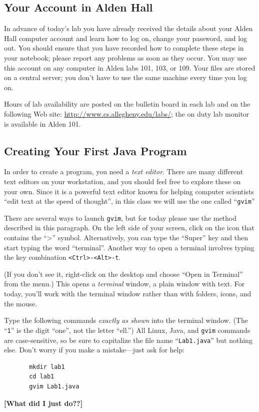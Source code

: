 \vspace*{-.3in}
\subsection*{Your Account in Alden Hall}

In advance of today's lab you have already received the details about your Alden Hall computer account and learn how to
log on, change your password, and log out.  You should ensure that you have recorded how to complete these steps in your
notebook; please report any problems as soon as they occur. You may use this account on any computer in Alden labs 101,
103, or 109. Your files are stored on a central server; you don't have to use the same machine every time you log on.

Hours of lab availability are posted on the bulletin board in each lab and on the following Web site:
\url{http://www.cs.allegheny.edu/labs/}; the on duty lab monitor is available in Alden 101.

\vspace*{-.1in}
\subsection*{Creating Your First Java Program}

In order to create a program, you need a {\em text editor}. There are many different text editors on your workstation, and
you should feel free to explore these on your own. Since it is a powerful text editor known for helping computer
scientists ``edit text at the speed of thought'', in this class we will use the one called ``{\tt gvim}''


There are several ways to launch {\tt gvim}, but for today please use the method described in this paragraph.  On the
left side of your screen, click on the icon that contains the ``>'' symbol.  Alternatively, you can type the ``Super''
key and then start typing the word ``terminal''.  Another way to open a terminal involves typing the key combination
{\tt <Ctrl>-<Alt>-t}.

(If you don't see it, right-click on the desktop and choose ``Open in Terminal'' from the menu.)  This opens a {\em
  terminal} window, a plain window with text. For today, you'll work with the terminal window rather than with folders,
icons, and the mouse.

Type the following commands {\em exactly as shown} into the terminal window. 
(The ``{\tt 1}'' is the digit ``one'', not the letter ``ell.'') All Linux, Java, 
and {\tt gvim}
commands are case-sensitive, so be sure to capitalize the file name 
``{\tt Lab1.java}'' but nothing else.
Don't worry if you make a mistake---just ask for help:
\begin{verbatim}
       mkdir lab1
       cd lab1
       gvim Lab1.java
       \end{verbatim}
       {\color{red}\bf [What did I just do??]}

